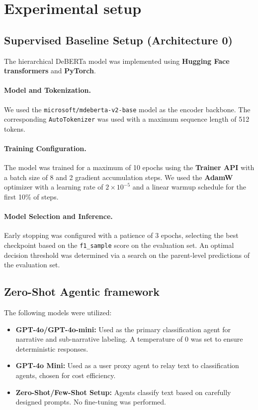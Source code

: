 \section{Experimental setup}

\subsection{Supervised Baseline Setup (Architecture 0)}

The hierarchical DeBERTa model was implemented using \textbf{Hugging Face transformers} \cite{wolf-etal-2020-transformers} and \textbf{PyTorch}.

\paragraph{Model and Tokenization.}
We used the \texttt{microsoft/mdeberta-v2-base} model as the encoder backbone. The corresponding \texttt{AutoTokenizer} was used with a maximum sequence length of 512 tokens.

\paragraph{Training Configuration.}
The model was trained for a maximum of 10 epochs using the \textbf{Trainer API} with a batch size of 8 and 2 gradient accumulation steps. We used the \textbf{AdamW} optimizer with a learning rate of \(2 \times 10^{-5}\) and a linear warmup schedule for the first 10\% of steps.

\paragraph{Model Selection and Inference.}
Early stopping was configured with a patience of 3 epochs, selecting the best checkpoint based on the \texttt{f1\_sample} score on the evaluation set. An optimal decision threshold was determined via a search on the parent-level predictions of the evaluation set.

\subsection{Zero-Shot Agentic framework}

The following models were utilized:

\begin{itemize}
  \item \textbf{GPT-4o/GPT-4o-mini:} Used as the primary classification agent for narrative and sub-narrative labeling. A temperature of 0 was set to ensure deterministic responses.
  \item \textbf{GPT-4o Mini:} Used as a user proxy agent to relay text to classification agents, chosen for cost efficiency.
  \item \textbf{Zero-Shot/Few-Shot Setup:} Agents classify text based on carefully designed prompts. No fine-tuning was performed.
\end{itemize}

